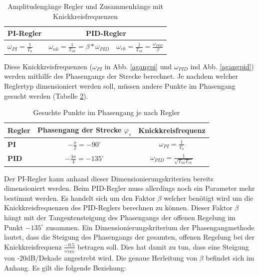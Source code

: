 \begin{table}[h]
\centering
\renewcommand*{\arraystretch}{1.7}
\begin{tabular}{|l|l|c|}
\hline 
\textbf{PI-Regler} & \multicolumn{2}{c|}{\textbf{PID-Regler}} \\ 
\hline 
$\omega_{PI}=\frac{1}{T_n}$ & $\omega_{nk}=\frac{1}{T_{nk}}=\beta*\omega_{PID}$ & $\omega_{vk}=\frac{1}{T_{vk}}=\frac{\omega_{PID}}{\beta}$ \\ 
\hline 
\end{tabular}
\caption[Amplitudengänge / Knickkreisfrequenzen]{Amplitudengänge Regler und Zusammenhänge mit Knickkreisfrequenzen}
\label{amplitudengaenge}
\renewcommand*{\arraystretch}{1} 
\end{table}

\newpage
Diese Knickkreisfrequenzen ($\omega_{PI}$ in Abb. \ref{agangpi} und $\omega_{PID}$ ind Abb. \ref{agangpid}) werden mithilfe des Phasengangs der Strecke berechnet. Je nachdem welcher Reglertyp dimensioniert werden soll, müssen andere Punkte im Phasengang gesucht werden (Tabelle \ref{phgangpunkte}).\newline

\begin{table}[h]
\centering
\renewcommand*{\arraystretch}{1.7}
\begin{tabular}{|l|c|c|}
\hline 
\textbf{Regler} & \textbf{Phasengang der Strecke $\varphi_s$} & \textbf{Knickkreisfrequenz}  \\ 
\hline 
\textbf{PI} & $-\frac{\pi}{2}=-90^\circ$ & $\omega_{PI}=\frac{1}{T_n}$ \\ 
\hline 
\textbf{PID} & $-\frac{3\pi}{4}=-135^\circ$ & $\omega_{PID}=\frac{1}{\sqrt{T_{nk}T_{vk}}}$ \\ 
\hline 
\end{tabular}
\caption[Wichtige Phasengangpunkte]{Gesuchte Punkte im Phasengang je nach Regler}
\label{phgangpunkte}
\renewcommand*{\arraystretch}{1} 
\end{table}

\newpage
Der PI-Regler kann anhand dieser Dimensionierungskriterien bereits dimensioniert werden. Beim PID-Regler muss allerdings noch ein Parameter mehr bestimmt werden. Es handelt sich um den Faktor $\beta$ welcher benötigt wird um die Knickkreisfrequenzen des PID-Reglers berechnen zu können. Dieser Faktor $\beta$ hängt mit der Tangentensteigung des Phasengangs der offenen Regelung im Punkt $-135^\circ$ zusammen.\newline
Ein Dimensionierungskriterium der Phasengangmethode lautet, dass die Steigung des Phasengangs der gesamten, offenen Regelung bei der Knickkreisfrequenz $\frac{-0.5}{\omega_{PID}}$ betragen soll. Dies hat damit zu tun, dass eine Steigung von -20dB/Dekade angestrebt wird. Die genaue Herleitung von $\beta$ befindet sich im Anhang. Es gilt die folgende Beziehung:\newline

